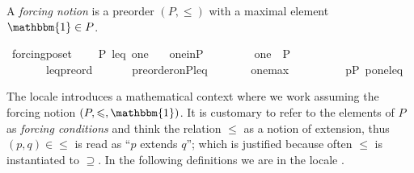 \begin{definition}
  A \emph{forcing notion} is a preorder $(P,\leqslant)$ with a maximal element $\mathbbm{1} \in P$.
  \begin{isabellebody}
\isanewline
{}\isamarkupfalse%
\ forcing{\isacharunderscore}poset\ {\isacharequal}\isanewline
\ \ \ P\ leq\ one\isanewline
\ \ \ one{\isacharunderscore}in{\isacharunderscore}P{\isacharcolon}\ \ \ \ \ \ \ \ \ {\isachardoublequoteopen}one\ {\isasymin}\ P{\isachardoublequoteclose}\isanewline
\ \ \ \ \ \ \ leq{\isacharunderscore}preord{\isacharcolon}\ \ \ \ \ \ \ {\isachardoublequoteopen}preorder{\isacharunderscore}on{\isacharparenleft}P{\isacharcomma}leq{\isacharparenright}{\isachardoublequoteclose}\isanewline
\ \ \ \ \ \ \ one{\isacharunderscore}max{\isacharcolon}\ \ \ \ \ \ \ \ \ \ {\isachardoublequoteopen}{\isasymforall}p{\isasymin}P{\isachardot}\ {\isasymlangle}p{\isacharcomma}one{\isasymrangle}{\isasymin}leq{\isachardoublequoteclose}\isanewline
\end{isabellebody}
\end{definition}
\noindent The locale  introduces a mathematical
context where we work assuming the forcing notion
$(P,\leqslant, \mathbbm{1})$. It is customary to refer to the elements
of $P$ as \emph{forcing conditions} and think the relation $\leqslant$
as a notion of extension, thus $(p,q) \in \leqslant$ is read as ``$p$
extends $q$''; which is justified because often $\leqslant$ is
instantiated to $\supseteq$. In the following definitions we are in
the locale .

